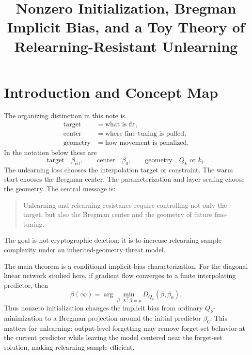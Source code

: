 \documentclass[11pt]{article}
\title{Nonzero Initialization, Bregman Implicit Bias, and a Toy Theory of Relearning-Resistant Unlearning}
\author{}
\date{}
\begin{document}
\maketitle

\section{Introduction and Concept Map}

The organizing distinction in this note is
\begin{equation}
    \begin{aligned}
    \text{target} &= \text{what is fit},\\
    \text{center} &= \text{where fine-tuning is pulled},\\
    \text{geometry} &= \text{how movement is penalized}.
    \end{aligned}
\end{equation}
In the notation below these are
\begin{equation}
    \text{target} \quad \beta_{\mathrm{eff}},
    \qquad
    \text{center} \quad \beta_0,
    \qquad
    \text{geometry} \quad Q_k \text{ or } k_i .
\end{equation}
The unlearning loss chooses the interpolation target or constraint. The warm start chooses the Bregman center. The parameterization and layer scaling choose the geometry. The central message is:
\begin{quote}
Unlearning and relearning resistance require controlling not only the target, but also the Bregman center and the geometry of future fine-tuning.
\end{quote}
The goal is not cryptographic deletion; it is to increase relearning sample complexity under an inherited-geometry threat model.

The main theorem is a conditional implicit-bias characterization. For the diagonal linear network studied here, if gradient flow converges to a finite interpolating predictor, then
\begin{equation}
    \beta(\infty)
    =
    \arg\min_{\beta:\,X^\top\beta=y}
    D_{Q_k}(\beta,\beta_0).
\end{equation}
Thus nonzero initialization changes the implicit bias from ordinary \(Q_k\)-minimization to a Bregman projection around the initial predictor \(\beta_0\). This matters for unlearning: output-level forgetting may remove forget-set behavior at the current predictor while leaving the model centered near the forget-set solution, making relearning sample-efficient.
\end{document}
